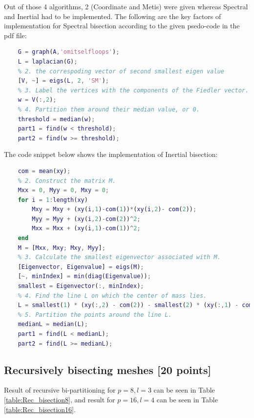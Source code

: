 \documentclass[unicode,11pt,a4paper,oneside,numbers=endperiod,openany]{scrartcl}
\begin{document}
Out of those 4 algorithms, 2 (Coordinate and Metis) were given whereas Spectral and Inertial had to be implemented. The following are the key factors of implementation for Spectral bisection according to the given psedo-code in the pdf file:\\

\begin{lstlisting}[language=Matlab]
    % 1. Construct the Laplacian.
    G = graph(A,'omitselfloops');
    L = laplacian(G);
    % 2. the correspoding vector of second smallest eigen value
    [V, ~] = eigs(L, 2, 'SM'); 
    % 3. Label the vertices with the components of the Fiedler vector.
    w = V(:,2);
    % 4. Partition them around their median value, or 0.
    threshold = median(w);
    part1 = find(w < threshold);
    part2 = find(w >= threshold);
\end{lstlisting}
\vspace{20px}
The code snippet below shows the implementation of Inertial bisection: \\

\begin{lstlisting}[language=Matlab]
    % 1. Calculate the center of mass (lets call it 'com').
    com = mean(xy);
    % 2. Construct the matrix M.
    Mxx = 0, Myy = 0, Mxy = 0;
    for i = 1:length(xy)
        Mxy = Mxy + (xy(i,1)-com(1))*(xy(i,2)- com(2));
        Myy = Myy + (xy(i,2)-com(2))^2;
        Mxx = Mxx + (xy(i,1)-com(1))^2;
    end
    M = [Mxx, Mxy; Mxy, Myy];
    % 3. Calculate the smallest eigenvector associated with M.
    [Eigenvector, Eigenvalue] = eigs(M);
    [~, minIndex] = min(diag(Eigenvalue));
    smallest = Eigenvector(:, minIndex);
    % 4. Find the line L on which the center of mass lies.
    L = smallest(1) * (xy(:,2) - com(2)) - smallest(2) * (xy(:,1) - com(1));
    % 5. Partition the points around the line L.
    medianL = median(L);
    part1 = find(L < medianL);
    part2 = find(L >= medianL);
 \end{lstlisting}


\subsection{Recursively bisecting meshes [20 points]}

Result of recursive bi-partitioning for ${p = 8, l = 3}$ can be seen in Table \ref{table:Rec_bisection8}, and result for ${p = 16, l = 4}$ can be seen in Table \ref{table:Rec_bisection16}.
\end{document}
